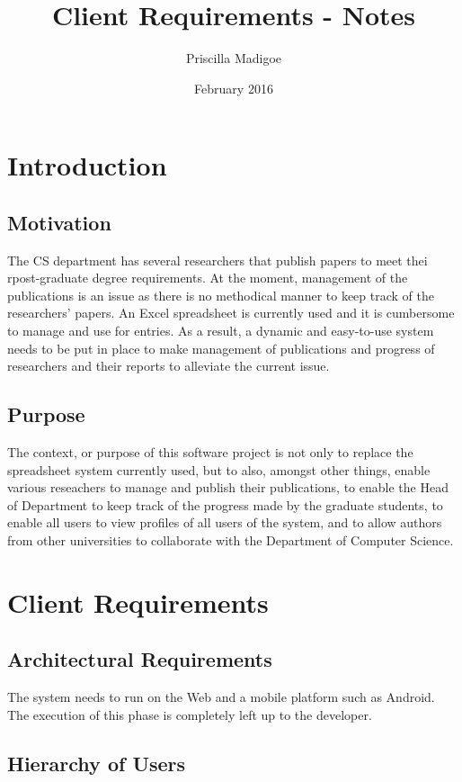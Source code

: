 \documentclass[a4paper,12pt]{article}
\begin{document}
\title{Client Requirements - Notes}
\author{Priscilla Madigoe}
\date{February 2016}
\maketitle

\section{Introduction}

\subsection{Motivation}
The CS department has several researchers that publish papers to meet thei rpost-graduate degree requirements. At the moment, management of the publications is an issue as there is no methodical manner to keep track of the researchers' papers. An Excel spreadsheet is currently used and it is cumbersome to manage and use for entries. As a result, a dynamic and easy-to-use system needs to be put in place to make management of publications and progress of researchers and their reports to alleviate the current issue.

\subsection{Purpose}
The context, or purpose of this software project is not only to replace the spreadsheet system currently used, but to also, amongst other things, enable various reseachers to manage and publish their publications, to enable the Head of Department to keep track of the progress made by the graduate students, to enable all users to view profiles of all users of the system, and to  allow authors from other universities to collaborate with the Department of Computer Science. 
\section{Client Requirements}

\subsection{Architectural Requirements}
The system needs to run on the Web and a mobile platform such as Android. The execution of this phase is completely left up to the developer.

\subsection{Hierarchy of Users}
\end{document}
